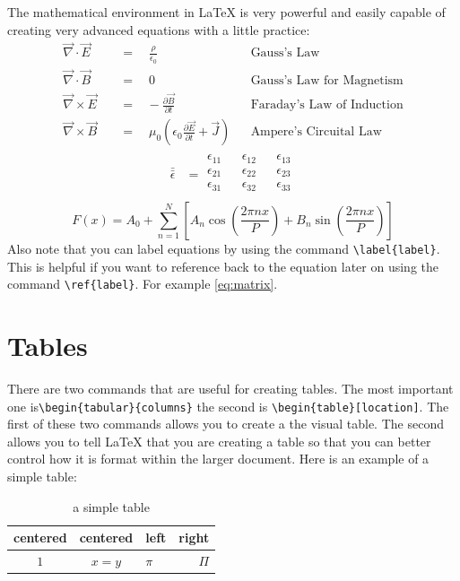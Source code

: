 \documentclass{article} 	%
\numberwithin{equation}{section}
\newcommand{\tensor}[1]{\bar{\bar{#1}}}		%
\begin{document}
		The mathematical environment in \LaTeX{} is very powerful and easily capable of creating very advanced equations with a little practice:
		\begin{align} 				%
		\vec{\nabla} \cdot \vec{E} \quad &=\quad\frac{\rho}{\epsilon_{0}} &&\text{Gauss's Law} \label{eq:GL}\\  	%
		\vec{\nabla} \cdot \vec{B} \quad &=\quad 0 &&\text{Gauss's Law for Magnetism} \label{eq:GLM}\\
		\vec{\nabla} \times \vec{E} \quad &=\hspace{10pt}-\frac{\partial{\vec{B}}}{\partial{t}} &&\text{Faraday's Law of Induction} \label{eq:FL}\\
		\vec{\nabla} \times \vec{B} \quad &=\quad \mu_0 \left( \epsilon_0\frac{\partial{\vec{E}}}{\partial{t}}+\vec{J} \right) &&\text{Ampere's Circuital Law} \label{eq:AL}
		\end{align}
		\begin{align}
		\tensor{\epsilon} &= \begin{matrix} %
			\epsilon_{11} && \epsilon_{12} &&\epsilon_{13} \\
			\epsilon_{21} && \epsilon_{22} &&\epsilon_{23} \\
			\epsilon_{31} && \epsilon_{32} &&\epsilon_{33} \\
		\end{matrix}
		\label{eq:matrix}  %
		\end{align}
		\begin{equation}
		F(x)= A_0 + \sum_{n=1}^N\left[ A_n\cos{\left(\frac{2\pi nx}{P}\right)}+B_n\sin{\left(\frac{2\pi nx}{P}\right)}\right]
		\end{equation}
		Also note that you can label equations by using the command \verb|\label{label}|.  This is helpful if you want to reference back to the equation later on using the command \verb|\ref{label}|.  For example \ref{eq:matrix}.
	\section{Tables}
	There are two commands that are useful for creating tables.  The most important one is\verb|\begin{tabular}{columns}| the second is \verb|\begin{table}[location]|.  The first of these two commands allows you to create a the visual table.  The second allows you to tell \LaTeX{} that you are creating a table so that you can better control how it is format within the larger document.  Here is an example of a simple table:
	\begin{table}[h]
		\caption{a simple table}
		\centering
		\begin{tabular}{|cc|l|r|}
			\hline
			centered & centered & left & right \\
			\hline
			$1$ & $x=y$&$\pi$&$\Pi$\\
			\hline
		\end{tabular}
	\end{table}
\end{document}

